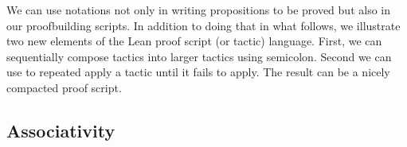 \documentclass[letterpaper,10pt,english]{sphinxmanual}
\begin{document}
\sphinxAtStartPar
We can use notations not only in writing
propositions to be proved but also in our
proof\sphinxhyphen{}building scripts. In addition to doing
that in what follows, we illustrate two new
elements of the Lean proof script (or tactic)
language. First, we can sequentially compose
tactics into larger tactics using semi\sphinxhyphen{}colon.
Second we can use  to repeated apply a
tactic until it fails to apply. The result
can be a nicely compacted proof script.

\begin{sphinxVerbatim}[commandchars=\\\{\}]
      
   
    
            
\end{sphinxVerbatim}


\subsection{Associativity}
\label{\detokenize{A_01_Propositional_Logic:associativity}}
\begin{sphinxVerbatim}[commandchars=\\\{\}]
                
                 
\end{sphinxVerbatim}
\end{document}
